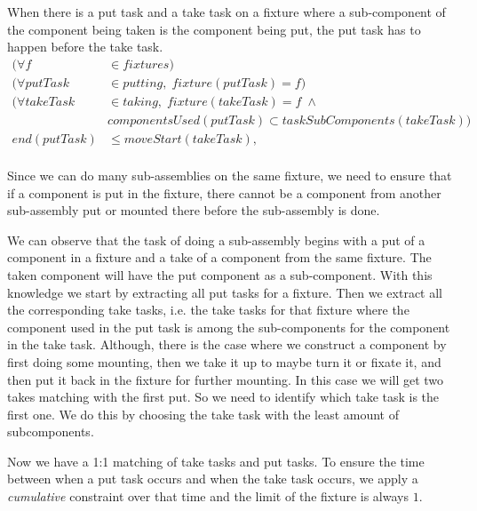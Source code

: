   \noindent When there is a put task and a take task on a fixture where a sub-component of the component being taken is the component being put, the put task has to happen before the take task.
 \begin{equation}
 \begin{aligned}\label{eq:99}
 (\forall f &\in fixtures) \\
 (\forall putTask &\in putting, \; fixture(putTask) = f)\\
 (\forall takeTask &\in taking, \; fixture(takeTask) = f \; \land \\
 &componentsUsed(putTask) \subset taskSubComponents(takeTask)) \\
 end(putTask) &\le moveStart(takeTask), \\
 \end{aligned}
 \end{equation}

  \noindent Since we can do many sub-assemblies on the same fixture, we need to ensure that if a component is put in the fixture, there cannot be a component from another sub-assembly put or mounted there before the sub-assembly is done.
  
  We can observe that the task of doing a sub-assembly begins with a put of a component in a fixture and a take of a component from the same fixture. The taken component will have the put component as a sub-component. With this knowledge we start by extracting all put tasks for a fixture. Then we extract all the corresponding take tasks, i.e. the take tasks for that fixture where the component used in the put task is among the sub-components for the component in the take task. Although, there is the case where we construct a component by first doing some mounting, then we take it up to maybe turn it or fixate it, and then put it back in the fixture for further mounting. In this case we will get two takes matching with the first put. So we need to identify which take task is the first one. We do this by choosing the take task with the least amount of subcomponents.
  
  Now we have a 1:1 matching of take tasks and put tasks. To ensure the time between when a put task occurs and when the take task occurs, we apply a \emph{cumulative} constraint over that time and the limit of the fixture is always $1$.
  
